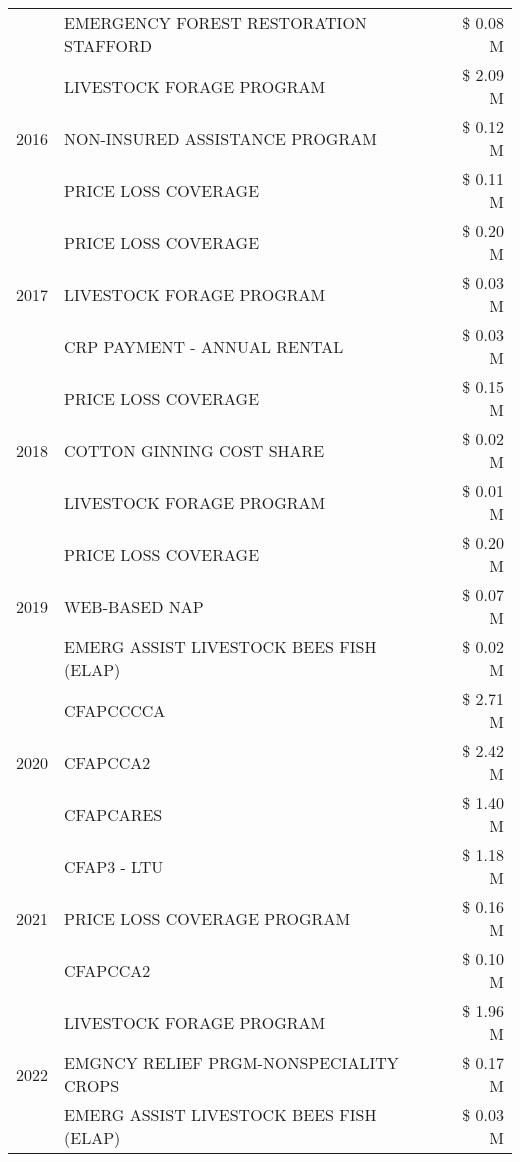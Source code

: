 \begin{tabular}{llr}
 & EMERGENCY FOREST RESTORATION STAFFORD & \$ 0.08 M \\
\cline{1-3}
\multirow[t]{3}{*}{2016} & LIVESTOCK FORAGE PROGRAM & \$ 2.09 M \\
 & NON-INSURED ASSISTANCE PROGRAM & \$ 0.12 M \\
 & PRICE LOSS COVERAGE & \$ 0.11 M \\
\cline{1-3}
\multirow[t]{3}{*}{2017} & PRICE LOSS COVERAGE & \$ 0.20 M \\
 & LIVESTOCK FORAGE PROGRAM & \$ 0.03 M \\
 & CRP PAYMENT - ANNUAL RENTAL & \$ 0.03 M \\
\cline{1-3}
\multirow[t]{3}{*}{2018} & PRICE LOSS COVERAGE & \$ 0.15 M \\
 & COTTON GINNING COST SHARE & \$ 0.02 M \\
 & LIVESTOCK FORAGE PROGRAM & \$ 0.01 M \\
\cline{1-3}
\multirow[t]{3}{*}{2019} & PRICE LOSS COVERAGE & \$ 0.20 M \\
 & WEB-BASED NAP & \$ 0.07 M \\
 & EMERG ASSIST LIVESTOCK BEES FISH (ELAP) & \$ 0.02 M \\
\cline{1-3}
\multirow[t]{3}{*}{2020} & CFAPCCCCA & \$ 2.71 M \\
 & CFAPCCA2 & \$ 2.42 M \\
 & CFAPCARES & \$ 1.40 M \\
\cline{1-3}
\multirow[t]{3}{*}{2021} & CFAP3 - LTU & \$ 1.18 M \\
 & PRICE LOSS COVERAGE PROGRAM & \$ 0.16 M \\
 & CFAPCCA2 & \$ 0.10 M \\
\cline{1-3}
\multirow[t]{3}{*}{2022} & LIVESTOCK FORAGE PROGRAM & \$ 1.96 M \\
 & EMGNCY RELIEF PRGM-NONSPECIALITY CROPS & \$ 0.17 M \\
 & EMERG ASSIST LIVESTOCK BEES FISH (ELAP) & \$ 0.03 M \\
\cline{1-3}
\bottomrule
\end{tabular}
